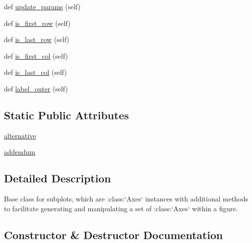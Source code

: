 \begin{DoxyCompactItemize}
def \hyperlink{classmatplotlib_1_1axes_1_1__subplots_1_1SubplotBase_abf692797a6837b4690144de58fe9c057}{update\+\_\+params} (self)
\item 
def \hyperlink{classmatplotlib_1_1axes_1_1__subplots_1_1SubplotBase_aa3e688c5a81fdb5c6e76f1969f31cfb1}{is\+\_\+first\+\_\+row} (self)
\item 
def \hyperlink{classmatplotlib_1_1axes_1_1__subplots_1_1SubplotBase_a4412d2361726f150e4bac73548ae74fa}{is\+\_\+last\+\_\+row} (self)
\item 
def \hyperlink{classmatplotlib_1_1axes_1_1__subplots_1_1SubplotBase_a4894e352939ab2fb9b917aae6f70d902}{is\+\_\+first\+\_\+col} (self)
\item 
def \hyperlink{classmatplotlib_1_1axes_1_1__subplots_1_1SubplotBase_a8daf928ef64c663c3f3dc77d8b0d2ed1}{is\+\_\+last\+\_\+col} (self)
\item 
def \hyperlink{classmatplotlib_1_1axes_1_1__subplots_1_1SubplotBase_a36ad2138f15cc058ee1e5bb7f0a68cef}{label\+\_\+outer} (self)
\end{DoxyCompactItemize}
\subsection*{Static Public Attributes}
\begin{DoxyCompactItemize}
\item 
\hyperlink{classmatplotlib_1_1axes_1_1__subplots_1_1SubplotBase_aab127e4d91d5a1aaab5af6995de63dae}{alternative}
\item 
\hyperlink{classmatplotlib_1_1axes_1_1__subplots_1_1SubplotBase_ae83d3ec376920c5f45efefbee46b0863}{addendum}
\end{DoxyCompactItemize}


\subsection{Detailed Description}
\begin{DoxyVerb}Base class for subplots, which are :class:`Axes` instances with
additional methods to facilitate generating and manipulating a set
of :class:`Axes` within a figure.
\end{DoxyVerb}
 

\subsection{Constructor \& Destructor Documentation}
\mbox{\label{classmatplotlib_1_1axes_1_1__subplots_1_1SubplotBase_a831809abdb684c76bc0e4fefb0b29119}} 
